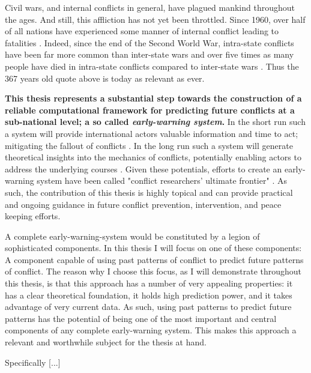 \documentclass[a4paper]{article}
\begin{document}
Civil wars, and internal conflicts in general, have plagued mankind throughout the ages. And still, this affliction has not yet been throttled. Since 1960, over half of all nations have experienced some manner of internal conflict leading to fatalities \citep[3-4]{Blattman_Miguel_2010}. Indeed, since the end of the Second World War, intra-state conflicts have been far more common than inter-state wars and over five times as many people have died in intra-state conflicts compared to inter-state wars \citep[563]{Collier_Hoeffler_2004}. Thus the 367 years old quote above is today as relevant as ever.\par

\textbf{This thesis represents a substantial step towards the construction of a reliable computational framework for predicting future conflicts at a sub-national level; a so called \emph{early-warning system}.} In the short run such a system will provide international actors valuable information and time to act; mitigating the fallout of conflicts \citep{Ward_Greenhill_Bakke_2010, perry_2013}. In the long run such a system will generate theoretical insights into the mechanics of conflicts, potentially enabling actors to address the underlying courses \citep{Schrodt_2014, chadefaux2017conflict}. Given these potentials, efforts to create an early-warning system have been called "conflict researchers’ ultimate frontier" \citep[474]{cederman2017predicting}. As such, the contribution of this thesis is highly topical and can provide practical and ongoing guidance in future conflict prevention, intervention, and peace keeping efforts.\par

A complete early-warning-system would be constituted by a legion of sophisticated components. In this thesis I will focus on one of these components: A component capable of using past patterns of conflict to predict future patterns of conflict. The reason why I choose this focus, as I will demonstrate throughout this thesis, is that this approach has a number of very appealing properties: it has a clear theoretical foundation, it holds high prediction power, and it takes advantage of very current data. As such, using past patterns to predict future patterns has the potential of being one of the most important and central components of any complete early-warning system. This makes this approach a relevant and worthwhile subject for the thesis at hand.\par

Specifically [...]
\end{document}
